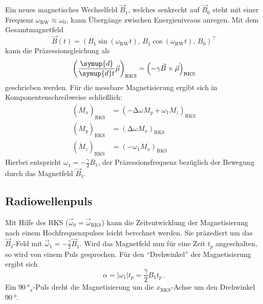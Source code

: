         \noindent Ein neues magnetisches Wechselfeld $\vec{B}_1$, welches senkrecht auf $\vec{B}_0$ steht mit einer Frequenz $\omega_\text{RW}\approx \omega_0$, kann Übergänge zwischen Energieniveaus anregen. 
        Mit dem Gesamtmagnetfeld 
        \begin{equation*}
            \vec{B}(t) = \left( B_1 \sin(\omega_\text{RW} t), \, B_1 \cos(\omega_\text{RW}t), \, B_0 \right)^\top
        \end{equation*}
        kann die Präzessionsgleichung als 
        \begin{equation*}
            \left(\frac{\symup{d}}{\symup{d}t} \vec{\mu}\right)_\text{RKS} =\left(- \gamma \vec{B} \times \vec{\mu}\right)_\text{RKS}
        \end{equation*}
        geschrieben werden. Für die messbare Magnetisierung ergibt sich in Komponentenschreibweise schließlich: 
        \begin{align*}
            \left(\dot{M}_x\right)_{\text{RKS}} & = \left(- \increment \omega M_y + \omega_1M_z \right)_{\text{RKS}} \\
            \left(\dot{M}_y\right)_{\text{RKS}} & = \left(\increment \omega M_x \right)_{\text{RKS}} \\
            \left(\dot{M}_z\right)_{\text{RKS}} & = \left( - \omega_1 M_x \right)_{\text{RKS}} 
        \end{align*} 
        Hierbei entspricht $\omega_1 = - \frac{\gamma}{2} B_1$, der Präzessionsfrequenz bezüglich der Bewegung durch das Magnetfeld $\vec{B}_1$.

    \subsection{Radiowellenpuls}

        \noindent Mit Hilfe des RKS ($\vec{\omega}_0 = \vec{\omega}_\text{RKS}$) kann die Zeitentwicklung der Magnetisierung nach einem Hochfrequenzpulses leicht berechnet werden. 
        Sie präzediert um das $\vec{B}_1$-Feld mit $\vec{\omega}_1 = - \frac{\gamma}{2} \vec{B}_1$. 
        Wird das Magnetfeld nun für eine Zeit $t_p$ angeschalten, so wird von einem Puls gesprochen. Für den \enquote{Drehwinkel} der Magnetisierung ergibt sich 
        \begin{equation*}
            \alpha = |\omega_1| t_p = \frac{\gamma}{2} B_1 t_p\, .
        \end{equation*}
        Ein $\SI{90}{\degree}_x$-Puls dreht die Magnetisierung um die $x_\text{RKS}$-Achse um den Drehwinkel $\SI{90}{\degree}$. 


